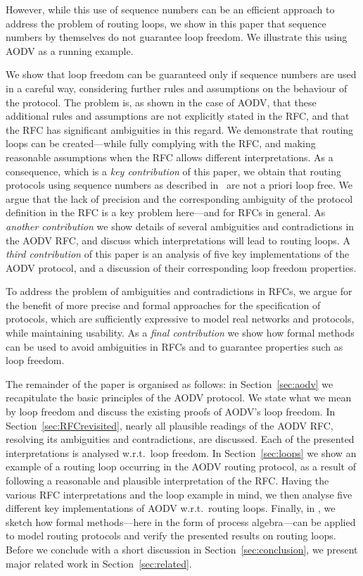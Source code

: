\documentclass[letterpaper]{sig-alternate-pages}
\begin{document}
However, while this use of sequence numbers can be an efficient approach to address the problem of routing loops, 
we show in this paper that  sequence numbers by themselves do not guarantee loop freedom. 
We illustrate this using AODV as a running example. 

We show that loop freedom can be guaranteed only if sequence numbers are used in a careful way, considering further rules and assumptions on the behaviour of the protocol.
The problem is, as shown in the case of AODV, that these additional rules and assumptions are not explicitly stated in the RFC, 
and that the RFC has significant ambiguities in this regard.
We demonstrate that routing loops can be created---while fully complying with the RFC, and
making reasonable assumptions when the RFC allows different interpretations.
As a consequence, which is a {\em key contribution} of this paper, we obtain
that routing protocols using sequence numbers as described
in~\cite{rfc3561} are not a priori loop free. We argue that the lack
of precision and the corresponding ambiguity of the protocol
definition in the RFC is a key problem here---and for RFCs in general. As {\em another contribution} we show
details of several ambiguities and contradictions in the AODV RFC,
and discuss which interpretations will lead to routing loops.
A {\em third contribution} of this paper is an ana\-lysis of five
key implementations of the AODV protocol, and a discussion of their
corresponding loop freedom properties.

To address the problem of ambiguities and contradictions in
  RFCs,  we argue for the benefit of more precise and formal
approaches for the specification of protocols, which are sufficiently
expressive to model real networks and protocols, while maintaining
usability. As a {\em final contribution} we show how formal methods can be used to avoid ambiguities in RFCs and to guarantee properties such as loop freedom.

The remainder of the paper is organised as follows: 
in Section~\ref{sec:aodv} we recapitulate the basic principles of the AODV protocol.
We state what we mean by loop freedom 
and discuss
the existing proofs of AODV's loop freedom.
In Section~\ref{sec:RFCrevisited}, nearly all plausible
readings of the AODV RFC, resolving its ambiguities and contradictions, are discussed. 
Each of the presented interpretations is analysed w.r.t.\ loop freedom.
In Section~\ref{sec:loops} we show an example of a routing loop occurring in the AODV routing protocol, as a result of following a reasonable and plausible interpretation of the RFC\@.
Having the various RFC interpretations and the loop example in mind, we then analyse five different
key implementations of AODV w.r.t.\ routing loops.
Finally, in , we sketch how 
formal methods---here in the form of process algebra---can
be applied to model routing protocols and verify the presented results on routing loops.
Before we conclude with a short discussion in Section~\ref{sec:conclusion},
we present major related work in Section~\ref{sec:related}.
\end{document}
